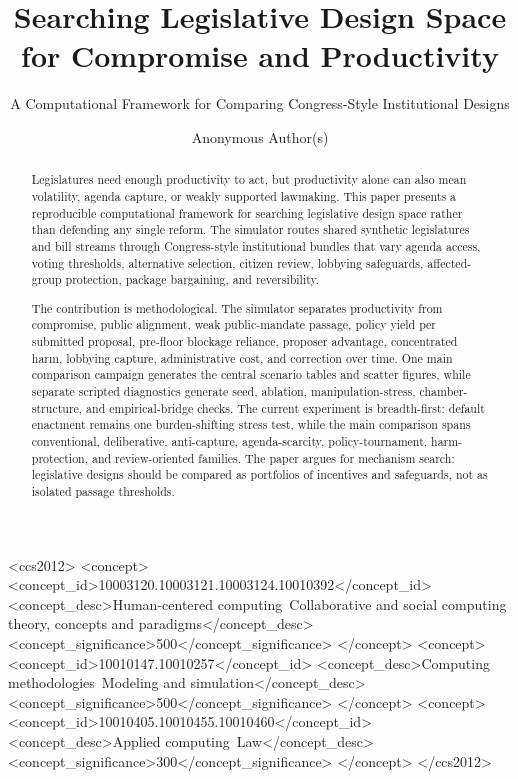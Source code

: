 \documentclass[manuscript,review,anonymous]{acmart}
\begin{document}
\title[Legislative Design Space]{Searching Legislative Design Space for Compromise and Productivity}
\subtitle{A Computational Framework for Comparing Congress-Style Institutional Designs}

\author{Anonymous Author(s)}
\renewcommand{\shortauthors}{Anonymous Author(s)}

\begin{abstract}
Legislatures need enough productivity to act, but productivity alone can also mean volatility, agenda capture, or weakly supported lawmaking. This paper presents a reproducible computational framework for searching legislative design space rather than defending any single reform. The simulator routes shared synthetic legislatures and bill streams through Congress-style institutional bundles that vary agenda access, voting thresholds, alternative selection, citizen review, lobbying safeguards, affected-group protection, package bargaining, and reversibility.

The contribution is methodological. The simulator separates productivity from compromise, public alignment, weak public-mandate passage, policy yield per submitted proposal, pre-floor blockage reliance, proposer advantage, concentrated harm, lobbying capture, administrative cost, and correction over time. One main comparison campaign generates the central scenario tables and scatter figures, while separate scripted diagnostics generate seed, ablation, manipulation-stress, chamber-structure, and empirical-bridge checks. The current experiment is breadth-first: default enactment remains one burden-shifting stress test, while the main comparison spans conventional, deliberative, anti-capture, agenda-scarcity, policy-tournament, harm-protection, and review-oriented families. The paper argues for mechanism search: legislative designs should be compared as portfolios of incentives and safeguards, not as isolated passage thresholds.
\end{abstract}

\begin{CCSXML}
<ccs2012>
<concept>
<concept_id>10003120.10003121.10003124.10010392</concept_id>
<concept_desc>Human-centered computing~Collaborative and social computing theory, concepts and paradigms</concept_desc>
<concept_significance>500</concept_significance>
</concept>
<concept>
<concept_id>10010147.10010257</concept_id>
<concept_desc>Computing methodologies~Modeling and simulation</concept_desc>
<concept_significance>500</concept_significance>
</concept>
<concept>
<concept_id>10010405.10010455.10010460</concept_id>
<concept_desc>Applied computing~Law</concept_desc>
<concept_significance>300</concept_significance>
</concept>
</ccs2012>
\end{CCSXML}
\end{document}
